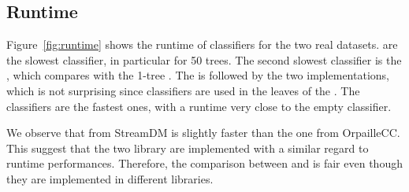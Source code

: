 \subsection{Runtime}
Figure~\ref{fig:runtime} shows the runtime of classifiers for the two real
datasets.
\mondrianforest are the slowest classifier, in particular for 50 trees. The
second slowest classifier is the \hoeffdingtree, which compares with the 1-tree
\mondrianforest. The \hoeffdingtree is followed by the two \naivebayes
implementations, which is not surprising since \naivebayes classifiers are used
in the leaves of the \hoeffdingtree. The \mcnn classifiers are the fastest
ones, with a runtime very close to the empty classifier.

We observe that \naivebayes from StreamDM is slightly faster than the one
from OrpailleCC. This suggest that the two library are implemented with a
similar regard to runtime performances. Therefore, the comparison between
\hoeffdingtree and \mondrianforest is fair even though they are implemented
in different libraries.

